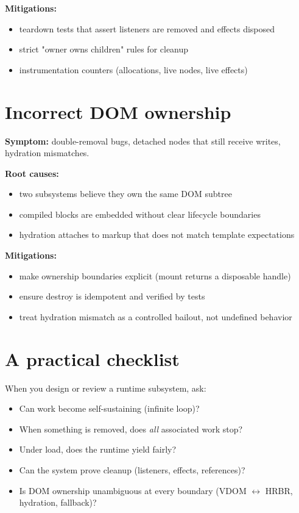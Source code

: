 \textbf{Mitigations:}
\begin{itemize}
  \item teardown tests that assert listeners are removed and effects disposed
  \item strict "owner owns children" rules for cleanup
  \item instrumentation counters (allocations, live nodes, live effects)
\end{itemize}

\section{Incorrect DOM ownership}

\textbf{Symptom:} double-removal bugs, detached nodes that still receive writes, hydration mismatches.

\textbf{Root causes:}
\begin{itemize}
  \item two subsystems believe they own the same DOM subtree
  \item compiled blocks are embedded without clear lifecycle boundaries
  \item hydration attaches to markup that does not match template expectations
\end{itemize}

\textbf{Mitigations:}
\begin{itemize}
  \item make ownership boundaries explicit (mount returns a disposable handle)
  \item ensure destroy is idempotent and verified by tests
  \item treat hydration mismatch as a controlled bailout, not undefined behavior
\end{itemize}

\section{A practical checklist}

When you design or review a runtime subsystem, ask:

\begin{itemize}
  \item Can work become self-sustaining (infinite loop)?
  \item When something is removed, does \emph{all} associated work stop?
  \item Under load, does the runtime yield fairly?
  \item Can the system prove cleanup (listeners, effects, references)?
  \item Is DOM ownership unambiguous at every boundary (VDOM \(\leftrightarrow\) HRBR, hydration, fallback)?
\end{itemize}
